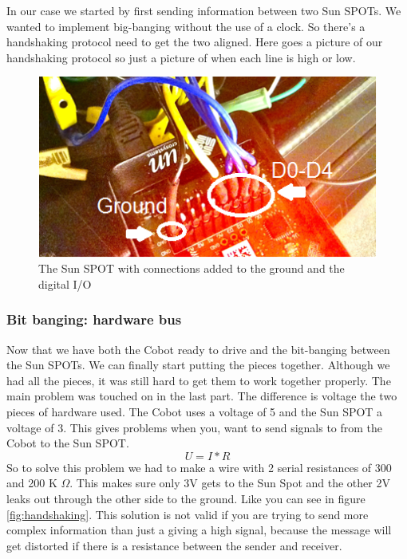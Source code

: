 \documentclass[a4paper,10pt]{article} %
\begin{document}
In our case we started by first sending information between two Sun SPOTs. We
wanted to implement big-banging without the use of a clock. So there's a
handshaking protocol need to get the two aligned. Here goes a picture of our
handshaking protocol so just a picture of when each line is high or low.
\begin{figure}
\label{fig:sunspotconnections}
\centering
\includegraphics{img/sunspotconnections1.png}
\caption{The Sun SPOT with connections added to the ground and the digital
I/O}
\end{figure}



\subsubsection{Bit banging: hardware bus} %

Now that we have both the Cobot ready to drive and the bit-banging between the
Sun SPOTs. We can finally start putting the pieces together. Although we had all
the pieces, it was still hard to get them to work together properly.  The main
problem was touched on in the last part. The difference is voltage the two
pieces of hardware used. The Cobot uses a voltage of 5 and the Sun SPOT a
voltage of 3. This gives problems when you, want to send signals to from the
Cobot to the Sun SPOT.  \begin{equation} \label{eq:voltage} U = I*R
\end{equation}
So to solve this problem we had to make a wire with 2 serial resistances of 300
and 200 K $\Omega$. This makes sure only 3V gets to the Sun Spot and the
other 2V leaks out through the other side to the ground. Like you can see in
figure \ref{fig:handshaking}.
This solution is not valid if you are trying to send more complex information
than just a giving a high signal, because the message will get distorted if
there is a resistance between the sender and receiver.
\end{document}

